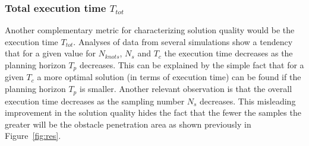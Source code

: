 \documentclass[eprint]{actapoly}
\begin{document}
\subsubsection{Total execution time $T_{tot}$}

Another complementary metric for characterizing solution quality would be the execution time
$T_{tot}$. Analyses of data from several simulations show a tendency that for a given value 
for $N_{knots}$, $N_s$ and $T_c$ the execution time decreases as the planning horizon $T_p$ decreases.
This can be explained by the simple fact that for a given $T_c$ a more optimal solution (in terms of execution time) can be found if the planning horizon $T_p$ is smaller.
%        
Another relevant observation is that the overall execution time decreases as the sampling 
number $N_s$ decreases. This misleading improvement in the solution quality hides the fact 
that the fewer the samples the greater will be the obstacle penetration area as shown previously in Figure~\ref{fig:res}.
\end{document}
